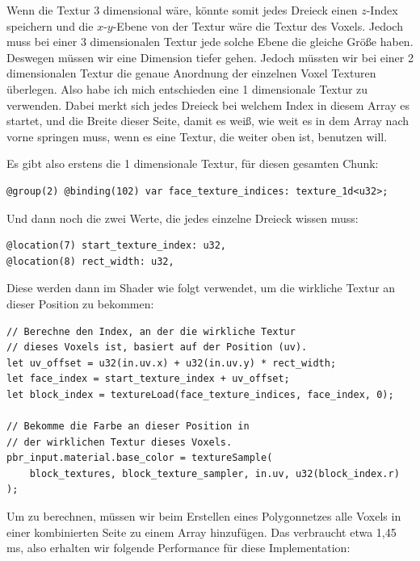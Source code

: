 Wenn die Textur 3 dimensional wäre, könnte somit
jedes Dreieck einen $z$-Index speichern und die
$x$-$y$-Ebene von der Textur wäre die Textur des Voxels.
Jedoch muss bei einer 3 dimensionalen Textur jede
solche Ebene die gleiche Größe haben.
Deswegen müssen wir eine Dimension tiefer gehen.
Jedoch müssten wir bei einer 2 dimensionalen Textur
die genaue Anordnung der einzelnen Voxel Texturen
überlegen.
Also habe ich mich entschieden eine 1 dimensionale
Textur zu verwenden.
Dabei merkt sich jedes Dreieck bei welchem Index
in diesem Array es startet, und die Breite dieser
Seite, damit es weiß, wie weit es in dem Array nach
vorne springen muss, wenn es eine Textur, die weiter
oben ist, benutzen will.
 
Es gibt also erstens die 1 dimensionale Textur,
für diesen gesamten Chunk:

\begin{lstlisting}[language=WGSL]
@group(2) @binding(102) var face_texture_indices: texture_1d<u32>;
\end{lstlisting}

Und dann noch die zwei Werte, die jedes einzelne
Dreieck wissen muss:

\begin{lstlisting}[language=WGSL]
@location(7) start_texture_index: u32,
@location(8) rect_width: u32,
\end{lstlisting}

Diese werden dann im  Shader wie
folgt verwendet, um die wirkliche Textur an
dieser Position zu bekommen:

\begin{lstlisting}[language=WGSL]
// Berechne den Index, an der die wirkliche Textur
// dieses Voxels ist, basiert auf der Position (uv).
let uv_offset = u32(in.uv.x) + u32(in.uv.y) * rect_width;
let face_index = start_texture_index + uv_offset;
let block_index = textureLoad(face_texture_indices, face_index, 0);

// Bekomme die Farbe an dieser Position in
// der wirklichen Textur dieses Voxels.
pbr_input.material.base_color = textureSample(
	block_textures, block_texture_sampler, in.uv, u32(block_index.r)
);
\end{lstlisting}

Um  zu berechnen,
müssen wir beim Erstellen eines Polygonnetzes
alle Voxels in einer kombinierten Seite
zu einem Array hinzufügen.
Das verbraucht etwa 1,45 ms,
also erhalten wir folgende Performance für
diese Implementation:

